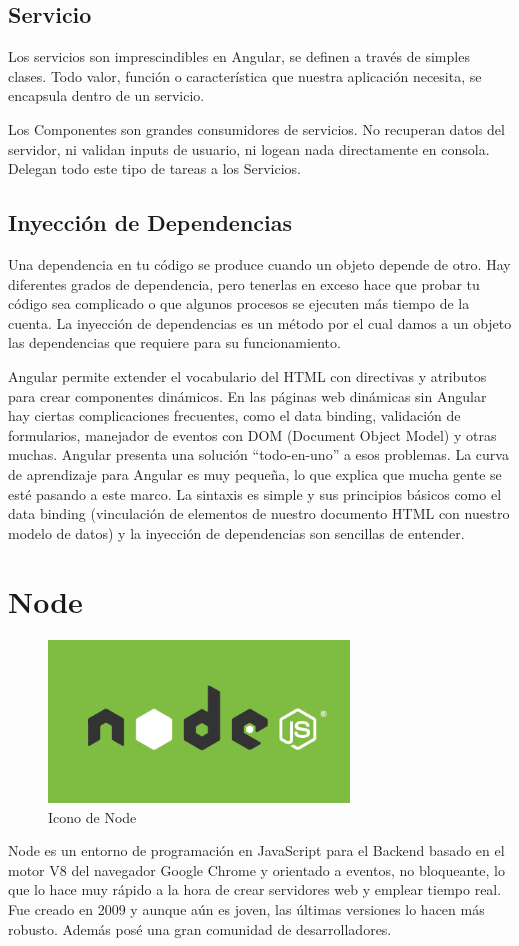 \subsection{Servicio }

Los servicios son imprescindibles en Angular, se definen a través de simples clases. Todo valor, función o característica que nuestra aplicación necesita, se encapsula dentro de un servicio.

Los Componentes son grandes consumidores de servicios. No recuperan datos del servidor, ni validan inputs de usuario, ni logean nada directamente en consola. Delegan todo este tipo de tareas a los Servicios.

\subsection{Inyección de Dependencias}  Una dependencia en tu código se produce cuando un objeto depende de otro. Hay diferentes grados de dependencia, pero tenerlas en exceso hace que probar tu código sea complicado o que algunos procesos se ejecuten más tiempo de la cuenta.
La inyección de dependencias es un método por el cual damos a un objeto las dependencias que requiere para su funcionamiento.


Angular permite extender el vocabulario del HTML con directivas y atributos para crear componentes dinámicos. En las páginas web dinámicas sin Angular hay ciertas complicaciones frecuentes, como el data binding, validación de formularios, manejador de eventos con DOM (Document Object Model) y otras muchas. Angular presenta una solución “todo-en-uno” a esos problemas.
La curva de aprendizaje para Angular es muy pequeña, lo que explica que mucha gente se esté pasando a este marco. La sintaxis es simple y sus principios básicos como el data binding (vinculación de elementos de nuestro documento HTML con nuestro modelo de datos) y la inyección de dependencias son sencillas de entender.

\section{Node}

\begin{figure}[!h]
    \centering
    \includegraphics[width=80mm]{img/infraestructura/node.png}
    \caption{Icono de Node}
\end{figure}
Node\cite{nodejs} es un entorno de programación en JavaScript para el Backend basado en el motor V8 del navegador Google Chrome y orientado a eventos, no bloqueante, lo que lo hace muy rápido a la hora de crear servidores web y emplear tiempo real. Fue creado en 2009 y aunque aún es joven, las últimas versiones lo hacen más robusto. Además posé una gran comunidad de desarrolladores.

